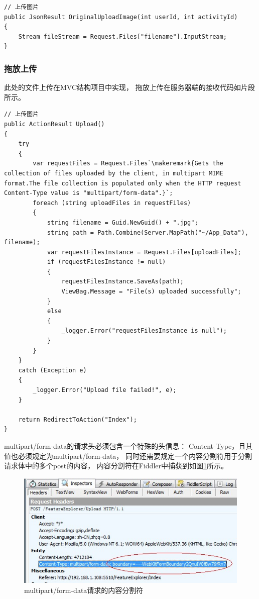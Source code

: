 \documentclass{book}
\newcounter{coderemarks}   %
\newcounter{codevar}     %
\newcommand{\circlemark}[1]{%
\tikz\node[text=white,font=\sffamily\bfseries,inner sep=0.2mm,draw,circle,fill=black]{#1};}
\newcommand{\makeremark}[1]{%
\circlemark{\arabic{coderemarks}}%
\global \expandafter\def \csname codebox\the\value{coderemarks}\endcsname{#1}%
\stepcounter{coderemarks}}
\newcommand{\showremarks}{%
\begin{list}{\circlemark{\arabic{codevar}}} %
{} %
\whiledo{\value{codevar} < \value{coderemarks}}{ %
\item \expandafter\csname codebox\the\value{codevar}\endcsname %
\stepcounter{codevar}} %
\end{list} %
\setcounter{coderemarks}{1}%
\setcounter{codevar}{1}%
}
\begin{document}
\begin{lstlisting}[language={[Sharp]C}]
// 上传图片
public JsonResult OriginalUploadImage(int userId, int activityId)
{   
    Stream fileStream = Request.Files["filename"].InputStream;
}
\end{lstlisting}

\subsubsection{拖放上传}

此处的文件上传在MVC结构项目中实现，
拖放上传在服务器端的接收代码如片段所示。

\begin{lstlisting}[language={[Sharp]C}]
// 上传图片
public ActionResult Upload()
{
    try
    {
        var requestFiles = Request.Files`\makeremark{Gets the collection of files uploaded by the client, in multipart MIME format.The file collection is populated only when the HTTP request Content-Type value is "multipart/form-data".}`;
        foreach (string uploadFiles in requestFiles)
        {
            string filename = Guid.NewGuid() + ".jpg";
            string path = Path.Combine(Server.MapPath("~/App_Data"), filename);
            var requestFilesInstance = Request.Files[uploadFiles];
            if (requestFilesInstance != null)
            {
                requestFilesInstance.SaveAs(path);
                ViewBag.Message = "File(s) uploaded successfully";
            }
            else
            {
                _logger.Error("requestFilesInstance is null");
            }
        }
    }
    catch (Exception e)
    {
        _logger.Error("Upload file failed!", e);
    }

    return RedirectToAction("Index");
}
\end{lstlisting}

\showremarks

multipart/form-data的请求头必须包含一个特殊的头信息：
Content-Type，且其值也必须规定为multipart/form-data，
同时还需要规定一个内容分割符用于分割请求体中的多个post的内容，
内容分割符在Fiddler中捕获到如图\ref{fig:HTTPPostFileContentSplit}所示。

\begin{figure}[htbp]
	\centering
	\includegraphics[scale=0.8]{HTTPPostFileContentSplit.jpg}
	\caption{multipart/form-data请求的内容分割符}
	\label{fig:HTTPPostFileContentSplit}
\end{figure}
\end{document}
